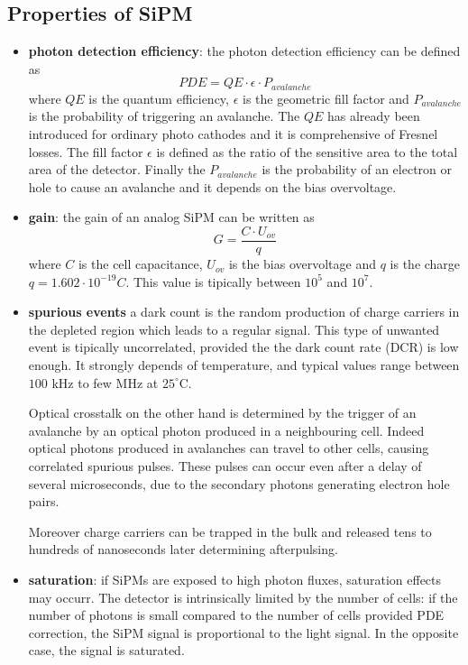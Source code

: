 \subsection{Properties of SiPM}
\begin{itemize}
\item \textbf{photon detection efficiency}: the photon detection efficiency can be defined as
\begin{equation}
PDE = QE \cdot \epsilon \cdot P_{avalanche}
\end{equation}
where $QE$ is the quantum efficiency, $\epsilon$ is the geometric fill factor and $P_{avalanche}$ is the probability of triggering an avalanche.
The $QE$ has already been introduced for ordinary photo cathodes and it is comprehensive of Fresnel losses.
The fill factor $\epsilon$ is defined as the ratio of the sensitive area to the total area of the detector.
Finally the $P_{avalanche}$ is the probability of an electron or hole to cause an avalanche and it depends on the bias overvoltage.

\item \textbf{gain}: the gain of an analog SiPM can be written as
\begin{equation}
G = \frac{C\cdot U_{ov}}{q}
\end{equation}
where $C$ is the cell capacitance, $U_{ov}$ is the bias overvoltage and $q$ is the charge $q = 1.602 \cdot 10^{-19} C$.
This value is tipically between $10^{5}$ and $10^{7}$.

\item \textbf{spurious events} a dark count is the random production of charge carriers in the depleted region which leads to a regular signal. This type of unwanted event is tipically uncorrelated, provided the the dark count rate (DCR) is low enough. It strongly depends of temperature, and typical values range between $100$ kHz to few MHz at $25^{\circ}$C.

Optical crosstalk on the other hand is determined by the trigger of an avalanche by an optical photon produced in a neighbouring cell. Indeed optical photons produced in avalanches can travel to other cells, causing correlated spurious pulses. These pulses can occur even after a delay of several microseconds, due to the secondary photons generating electron hole pairs.

Moreover charge carriers can be trapped in the bulk and released tens to hundreds of nanoseconds later determining afterpulsing.

\item \textbf{saturation}: if SiPMs are exposed to high photon fluxes, saturation effects may occurr. The detector is intrinsically limited by the number of cells: if the number of photons is small compared to the number of cells provided PDE correction, the SiPM signal is proportional to the light signal. In the opposite case, the signal is saturated.
\end{itemize}

